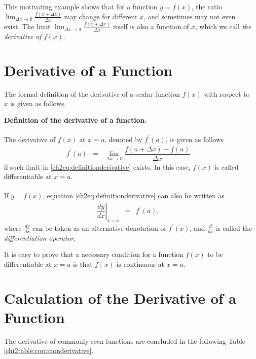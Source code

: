 This motivating example shows that for a function $y=f(x)$, the ratio $\lim_{\Delta x \rightarrow 0}\frac{f(x + \Delta x)}{\Delta x}$ may change for different $x$, and sometimes may not even exist. The limit  $\lim_{\Delta x \rightarrow 0}\frac{f(x + \Delta x)}{\Delta x}$ itself is also a function of $x$, which we call \textit{the derivative of $f(x)$}.

\section{Derivative of a Function}

The formal definition of the derivative of a scalar function $f(x)$ with respect to $x$ is given as follows.

\begin{VF}
\textbf{Definition of the derivative of a function}:
\\
\\
\noindent The derivative of $f(x)$ at $x=a$, denoted by $f^\prime(a)$, is given as follows
\begin{eqnarray}
  f^\prime(a) &=& \lim_{\Delta x \rightarrow 0}\dfrac{f\left(a + \Delta x\right)-f(a)}{\Delta x} \label{ch2eq:definitionderivative}
\end{eqnarray}
if such limit in \eqref{ch2eq:definitionderivative} exists. In this case, $f(x)$ is called differentiable at $x=a$.
\\
\\
If $y=f(x)$, equation \eqref{ch2eq:definitionderivative} can also be written as
\begin{eqnarray}
  \left.\dfrac{dy}{dx}\right|_{x=a} &=& f^\prime(a), \nonumber
\end{eqnarray}
where $\frac{dy}{dx}$ can be taken as an alternative denotation of $f^\prime(x)$, and $\frac{d}{dx}$ is called the \textit{differentiation operator}.
\end{VF}

It is easy to prove that a necessary condition for a function $f(x)$ to be differentiable at $x=a$ is that $f(x)$ is continuous at $x=a$.

\section{Calculation of the Derivative of a Function}

The derivative of commonly seen functions are concluded in the following Table \ref{chi2table:commonderivative}.

